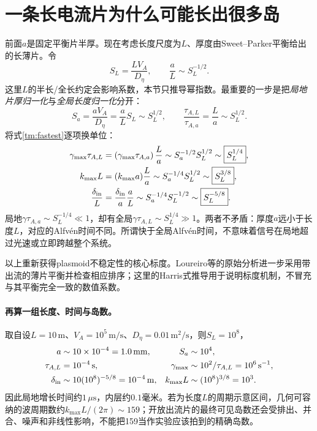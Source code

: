 \section{一条长电流片为什么可能长出很多岛}
前面$a$是固定平衡片半厚。现在考虑长度尺度为$L$、厚度由Sweet--Parker平衡给出的长薄片。令
\begin{equation}
 S_L=\frac{LV_A}{D_\eta},\qquad \frac aL\sim S_L^{-1/2}.
\end{equation}
这里$L$的半长/全长约定会影响系数，本节只推导幂指数。最重要的一步是把\emph{局地片厚归一化}与\emph{全局长度归一化}分开：
\begin{equation}
 S_a=\frac{aV_A}{D_\eta}=\frac aL S_L\sim S_L^{1/2},
 \qquad \frac{\tau_{A,L}}{\tau_{A,a}}=\frac La\sim S_L^{1/2}.
\end{equation}
将式\eqref{tm:fastest}逐项换单位：
\begin{align}
 \gamma_{\max}\tau_{A,L}
 &=\left(\gamma_{\max}\tau_{A,a}\right)\frac La
 \sim S_a^{-1/2}S_L^{1/2}
 \sim\boxed{S_L^{1/4}},\label{tm:plasmoidgamma}\\
 k_{\max}L&=(k_{\max}a)\frac La
 \sim S_a^{-1/4}S_L^{1/2}
 \sim\boxed{S_L^{3/8}},\label{tm:plasmoidk}\\
 \frac{\delta_{\rm in}}L&=\frac{\delta_{\rm in}}a\frac aL
 \sim S_a^{-1/4}S_L^{-1/2}
 \sim\boxed{S_L^{-5/8}}.\label{tm:plasmoidwidth}
\end{align}
局地$\gamma\tau_{A,a}\sim S_L^{-1/4}\ll1$，却有全局$\gamma\tau_{A,L}\sim S_L^{1/4}\gg1$。两者不矛盾：厚度$a$远小于长度$L$，对应的Alfv\'en时间不同。所谓快于全局Alfv\'en时间，不意味着信号在局地超过光速或立即跨越整个系统。

以上重新获得plasmoid不稳定性的核心标度。Loureiro等的原始分析进一步采用带出流的薄片平衡并检查相应排序；这里的Harris式推导用于说明标度机制，不冒充与其平衡完全一致的数值系数。\citep{TMLoureiro2007}

\paragraph{再算一组长度、时间与岛数。}
取自设$L=10\,\mathrm m$、$V_A=10^5\,\mathrm{m/s}$、$D_\eta=0.01\,\mathrm{m^2/s}$，则$S_L=10^8$，
\begin{align}
 a&\sim10\times10^{-4}=1.0\,\mathrm{mm},&
 S_a&\sim10^4,\\
 \tau_{A,L}&=10^{-4}\,\mathrm s,&
 \gamma_{\max}&\sim10^2/\tau_{A,L}=10^6\,\mathrm{s^{-1}},\\
 \delta_{\rm in}&\sim10(10^8)^{-5/8}=10^{-4}\,\mathrm m,&
 k_{\max}L&\sim(10^8)^{3/8}=10^3.
\end{align}
因此局地增长时间约$1\,\mu\mathrm s$，内层约$0.1$毫米。若为长度$L$的周期示意区间，几何可容纳的波周期数约$k_{\max}L/(2\pi)\sim159$；开放出流片的最终可见岛数还会受排出、并合、噪声和非线性影响，不能把159当作实验应该拍到的精确岛数。

